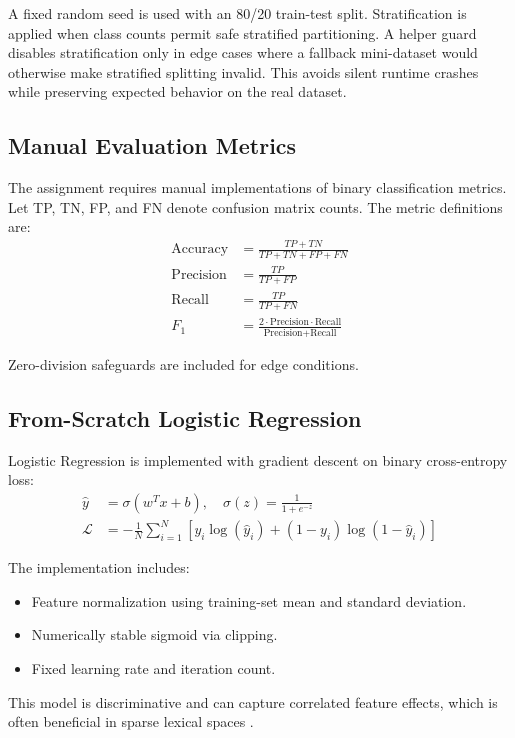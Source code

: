 A fixed random seed is used with an 80/20 train-test split. Stratification is applied when class counts permit safe stratified partitioning. A helper guard disables stratification only in edge cases where a fallback mini-dataset would otherwise make stratified splitting invalid. This avoids silent runtime crashes while preserving expected behavior on the real dataset.

\subsection{Manual Evaluation Metrics}

The assignment requires manual implementations of binary classification metrics. Let TP, TN, FP, and FN denote confusion matrix counts. The metric definitions are:
\begin{align}
\text{Accuracy} &= \frac{TP + TN}{TP + TN + FP + FN} \\
\text{Precision} &= \frac{TP}{TP + FP} \\
\text{Recall} &= \frac{TP}{TP + FN} \\
F_1 &= \frac{2 \cdot \text{Precision} \cdot \text{Recall}}{\text{Precision} + \text{Recall}}
\end{align}

Zero-division safeguards are included for edge conditions.

\subsection{From-Scratch Logistic Regression}

Logistic Regression is implemented with gradient descent on binary cross-entropy loss:
\begin{align}
\hat{y} &= \sigma(w^Tx + b), \quad \sigma(z)=\frac{1}{1+e^{-z}} \\
\mathcal{L} &= -\frac{1}{N}\sum_{i=1}^{N}\left[y_i\log(\hat{y}_i)+(1-y_i)\log(1-\hat{y}_i)\right]
\end{align}

The implementation includes:
\begin{itemize}
    \item Feature normalization using training-set mean and standard deviation.
    \item Numerically stable sigmoid via clipping.
    \item Fixed learning rate and iteration count.
\end{itemize}

This model is discriminative and can capture correlated feature effects, which is often beneficial in sparse lexical spaces \cite{hastie2009elements,manning2008introduction}.

